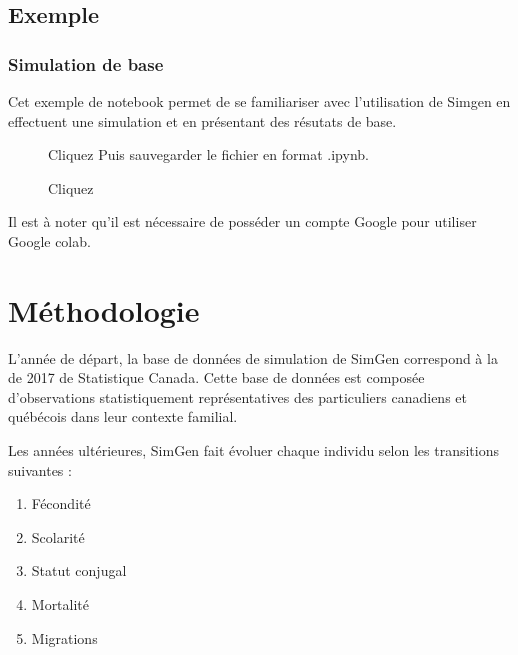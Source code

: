 \documentclass[letterpaper,10pt,french]{sphinxmanual}
\begin{document}
\section{Exemple}
\label{\detokenize{utilisation:exemple}}

\subsection{Simulation de base}
\label{\detokenize{utilisation:simulation-de-base}}
Cet exemple de notebook permet de se familiariser avec l’utilisation de Simgen en effectuent une simulation
et en présentant des résutats de base.
\begin{description}
\item[{}] \leavevmode
Cliquez 
Puis sauvegarder le fichier en format .ipynb.

\item[{}] \leavevmode
Cliquez 

\end{description}

Il est à noter qu’il est nécessaire de posséder un compte Google pour utiliser Google colab.


\chapter{Méthodologie}
\label{\detokenize{methodologie:methodologie}}\label{\detokenize{methodologie:transition-models}}\label{\detokenize{methodologie::doc}}
L’année de départ, la base de données de simulation de SimGen correspond  à
la  de 2017 de Statistique Canada.
Cette base de données est composée
d’observations statistiquement représentatives des particuliers canadiens et québécois
dans leur contexte familial.

Les années ultérieures, SimGen fait évoluer chaque individu selon les transitions suivantes :
\begin{enumerate}
%
\item {} 
Fécondité

\item {} 
Scolarité

\item {} 
Statut conjugal

\item {} 
Mortalité

\item {} 
Migrations

\end{enumerate}
\end{document}

